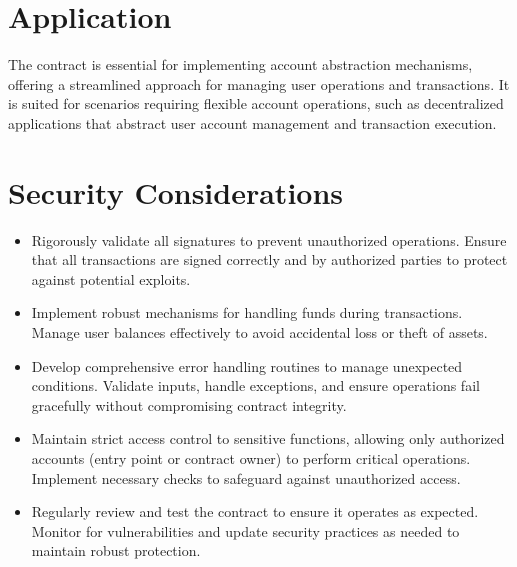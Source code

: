 \documentclass[letterpaper,10pt,english]{sphinxmanual}
\begin{document}
\section{Application}
\label{\detokenize{docs_minimal_account_abstraction:application}}
\sphinxAtStartPar
The  contract is essential for implementing account abstraction mechanisms, offering a streamlined approach for managing user operations and transactions. It is suited for scenarios requiring flexible account operations, such as decentralized applications that abstract user account management and transaction execution.


\section{Security Considerations}
\label{\detokenize{docs_minimal_account_abstraction:security-considerations}}\begin{itemize}
\item {} 
\sphinxAtStartPar
{}
Rigorously validate all signatures to prevent unauthorized operations. Ensure that all transactions are signed correctly and by authorized parties to protect against potential exploits.

\item {} 
\sphinxAtStartPar
{}
Implement robust mechanisms for handling funds during transactions. Manage user balances effectively to avoid accidental loss or theft of assets.

\item {} 
\sphinxAtStartPar
{}
Develop comprehensive error handling routines to manage unexpected conditions. Validate inputs, handle exceptions, and ensure operations fail gracefully without compromising contract integrity.

\item {} 
\sphinxAtStartPar
{}
Maintain strict access control to sensitive functions, allowing only authorized accounts (entry point or contract owner) to perform critical operations. Implement necessary checks to safeguard against unauthorized access.

\item {} 
\sphinxAtStartPar
{}
Regularly review and test the contract to ensure it operates as expected. Monitor for vulnerabilities and update security practices as needed to maintain robust protection.

\end{itemize}



\renewcommand{\indexname}{Index}
\printindex
\end{document}
